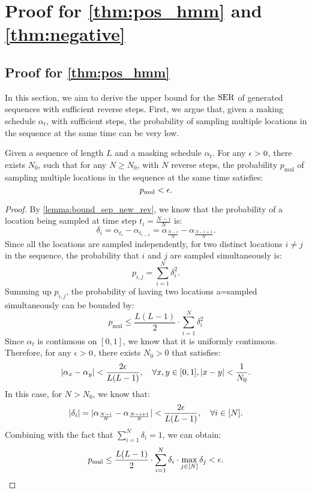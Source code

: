 
\section{Proof for \cref{thm:pos_hmm} and \cref{thm:negative}}
\subsection{Proof for \cref{thm:pos_hmm}}
\label{app:proof_hmm_pos}
In this section, we aim to derive the upper bound for the $\operatorname{SER}$ of generated sequences with sufficient reverse steps. First, we argue that, given a making schedule $\alpha_t$, with sufficient steps, the probability of sampling multiple locations in the sequence at the same time can be very low.

\begin{lemma}
\label{lemma:prob_mul_suff}
    Given a sequence of length $L$ and a masking schedule $\alpha_t$. For any ${\epsilon}>0$, there exists $N_0$, such that for any $N\geq N_0$, with $N$ reverse steps, the probability $p_\mathrm{mul}$ of sampling multiple locations in the sequence at the same time satisfies:
    $$p_\mathrm{mul}<{\epsilon}.$$
\end{lemma}

\begin{proof}
    By \cref{lemma:bound_sep_new_rev}, we know that the probability of a location being sampled at time step $t_i=\frac{N-i}{N}$ is:
    $$\delta_i=\alpha_{t_i}-\alpha_{t_{i-1}}=\alpha_\frac{N-i}{N}-\alpha_\frac{N-i+1}{N}.$$
    Since all the locations are sampled independently, for two distinct locations $i\neq j$ in the sequence, the probability that $i$ and $j$ are sampled simultaneously is:
    $$p_{i,j}=\sum_{i=1}^{N}\delta_i^2.$$
    Summing up $p_{i,j}$, the probability of having two locations a=sampled simultaneously can be bounded by:
    $$p_\mathrm{mul}\leq \frac{L(L-1)}{2}\cdot\sum_{i=1}^{N}\delta_i^2$$
    Since $\alpha_t$ is continuous on $[0,1]$, we know that it is uniformly continuous. Therefore, for any ${\epsilon}>0$, there exists $N_0>0$ that satisfies:
    $$|\alpha_x-\alpha_y|<\frac{2{\epsilon}}{L(L-1)}, \quad\forall x,y\in [0,1], |x-y|<\frac{1}{N_0}.$$
    In this case, for $N>N_0$, we know that:
    $$|\delta_i|=|\alpha_\frac{N-i}{N}-\alpha_\frac{N-i+1}{N}|<\frac{2{\epsilon}}{L(L-1)},\quad\forall i\in [N].$$
    Combining with the fact that $\sum_{i=1}^N\delta_i=1$, we can obtain:
    $$p_\mathrm{mul}\leq \frac{L(L-1)}{2}\cdot\sum_{i=1}^{N}\delta_i\cdot\max_{j\in [N]}\delta_j<{\epsilon}.$$
\end{proof}

